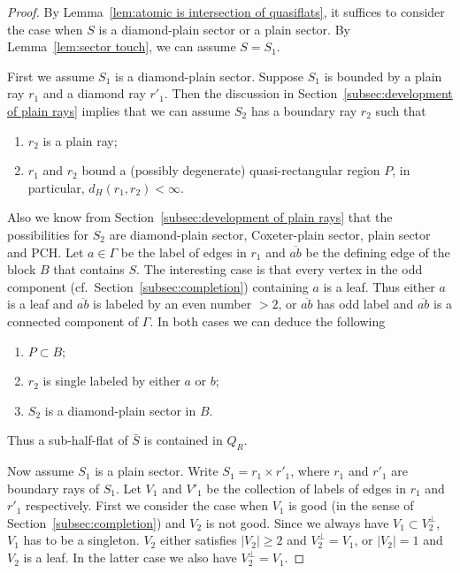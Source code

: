 \documentclass[11pt]{amsart}
\theoremstyle{definition}
\begin{document}
\begin{proof}
By Lemma~\ref{lem:atomic is intersection of quasiflats}, it suffices to consider the case when $S$ is a diamond-plain sector or a plain sector.  By Lemma~\ref{lem:sector touch}, we can assume $S=S_1$. 

First we assume $S_1$ is a diamond-plain sector. Suppose $S_1$ is bounded by a plain ray $r_1$ and a diamond ray $r'_1$. Then the discussion in Section~\ref{subsec:development of plain rays} implies that we can assume $S_2$ has a boundary ray $r_2$ such that 
\begin{enumerate}
	\item $r_2$ is a plain ray;
	\item $r_1$ and $r_2$ bound a (possibly degenerate) quasi-rectangular region $P$, in particular, $d_H(r_1,r_2)<\infty$.
\end{enumerate}
Also we know from Section~\ref{subsec:development of plain rays} that the possibilities for $S_2$ are diamond-plain sector, Coxeter-plain sector, plain sector and PCH. Let $a\in\Gamma$ be the label of edges in $r_1$ and $\overline{ab}$ be the defining edge of the block $B$ that contains $S$. The interesting case is that every vertex in the odd component (cf.\ Section~\ref{subsec:completion}) containing $a$ is a leaf. Thus either $a$ is a leaf and $\overline{ab}$ is labeled by an even number $>2$, or $\overline{ab}$ has odd label and $\overline{ab}$ is a connected component of $\Gamma$. In both cases we can deduce the following
\begin{enumerate}
	\item $P\subset B$;
	\item $r_2$ is single labeled by either $a$ or $b$;
	\item $S_2$ is a diamond-plain sector in $B$.
\end{enumerate}
Thus a sub-half-flat of $\bar{S}$ is contained in $Q_R$.

Now assume $S_1$ is a plain sector. Write $S_1=r_1\times r'_1$, where $r_1$ and $r'_1$ are boundary rays of $S_1$. Let $V_1$ and $V'_1$ be the collection of labels of edges in $r_1$ and $r'_1$ respectively. First we consider the case when $V_1$ is good (in the sense of Section~\ref{subsec:completion}) and $V_2$ is not good. Since we always have $V_1\subset V^{\perp}_2$, $V_1$ has to be a singleton. $V_2$ either satisfies $|V_2|\ge 2$ and $V^{\perp}_2=V_1$, or $|V_2|=1$ and $V_2$ is a leaf. In the latter case we also have $V^{\perp}_2=V_1$. 


\end{proof}
\end{document}
